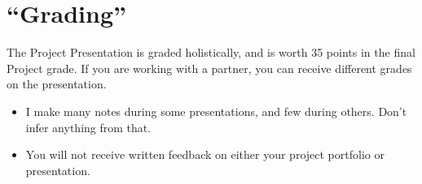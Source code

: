 \documentclass[]{book}
\providecommand{\tightlist}{%
  \setlength{\itemsep}{0pt}\setlength{\parskip}{0pt}}
\begin{document}
\hypertarget{grading-11}{%
\section{``Grading''}\label{grading-11}}

The Project Presentation is graded holistically, and is worth 35 points in the final Project grade. If you are working with a partner, you can receive different grades on the presentation.

\begin{itemize}
\tightlist
\item
  I make many notes during some presentations, and few during others. Don't infer anything from that.
\item
  You will not receive written feedback on either your project portfolio or presentation.
\end{itemize}


\end{document}
